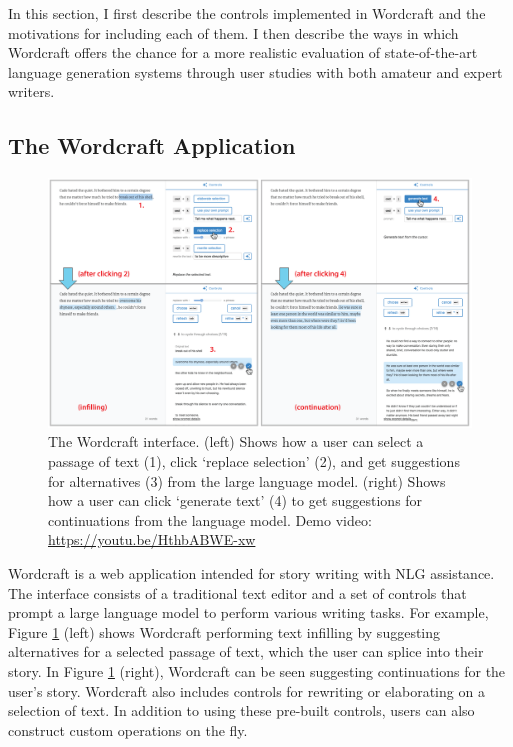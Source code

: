 In this section, I first describe the controls implemented in Wordcraft and the motivations for including each of them.
I then describe the ways in which Wordcraft offers the chance for a more realistic evaluation of state-of-the-art language generation systems through user studies with both amateur and expert writers.

\subsection{The Wordcraft Application}
\label{section:wordcraft_controls}

\begin{figure}[th]
  \centering
  \includegraphics[width=0.99\linewidth]{figures/interface}
  \caption{The Wordcraft interface. (left) Shows how a user can select a passage of text (1), click `replace selection' (2), and get suggestions for alternatives (3) from the large language model. (right) Shows how a user can click `generate text' (4) to get suggestions for continuations from the language model. Demo video: \href{https://youtu.be/HthbABWE-xw}{https://youtu.be/HthbABWE-xw}}
  \label{fig:interface}
\end{figure}


Wordcraft is a web application intended for story writing with NLG assistance.
The interface consists of a traditional text editor and a set of controls that prompt a large language model to perform various writing tasks.
For example, Figure \ref{fig:interface} (left) shows Wordcraft performing text infilling by suggesting alternatives for a selected passage of text, which the user can splice into their story.
In Figure \ref{fig:interface} (right), Wordcraft can be seen suggesting continuations for the user's story.
Wordcraft also includes controls for rewriting or elaborating on a selection of text. In addition to using these pre-built controls, users can also construct custom operations on the fly.

